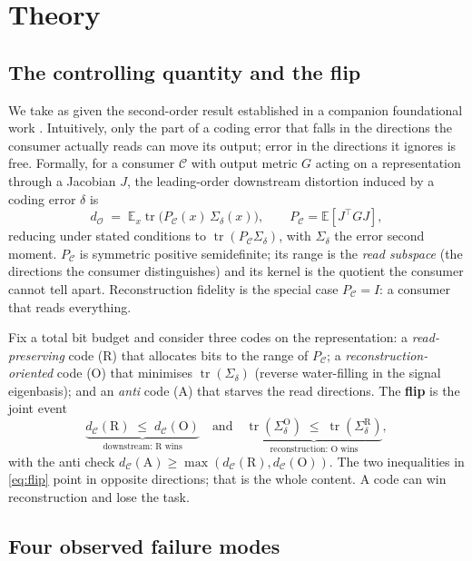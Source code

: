 \documentclass[11pt]{article}
\theoremstyle{remark}
\newcommand{\PC}{P_{\mathcal{C}}}
\newcommand{\Sd}{\Sigma_{\delta}}
\newcommand{\tr}{\operatorname{tr}}
\newcommand{\dO}{d_{\mathcal{O}}}
\newcommand{\E}{\mathbb{E}}
\begin{document}
\section{Theory}\label{sec:theory}

\subsection{The controlling quantity and the flip}

We take as given the second-order result established in a companion foundational work
\citep{cost}. Intuitively, only the part of a coding error that falls in the
directions the consumer actually reads can move its output; error in the directions it
ignores is free. Formally, for a consumer $\mathcal{C}$ with output metric $G$ acting on a
representation through a Jacobian $J$, the leading-order downstream distortion induced by
a coding error $\delta$ is
\begin{equation}\label{eq:do}
\dO \;=\; \E_x \tr\!\big(\PC(x)\,\Sd(x)\big),\qquad \PC=\E[J^\top G J],
\end{equation}
reducing under stated conditions to $\tr(\PC\Sd)$, with $\Sd$ the error second moment.
$\PC$ is symmetric positive semidefinite; its range is the \emph{read subspace} (the
directions the consumer distinguishes) and its kernel is the quotient the consumer cannot
tell apart. Reconstruction fidelity is the special case $\PC=I$: a consumer that reads
everything.

Fix a total bit budget and consider three codes on the representation:
a \emph{read-preserving} code (R) that allocates bits to the range of $\PC$; a
\emph{reconstruction-oriented} code (O) that minimises $\tr(\Sd)$ (reverse water-filling
\citep{cover2006} in the signal eigenbasis); and an \emph{anti} code (A) that starves the
read directions.
The \textbf{flip} is the joint event
\begin{equation}\label{eq:flip}
\underbrace{d_{\mathcal C}(\text{R}) \;\le\; d_{\mathcal C}(\text{O})}_{\text{downstream: R wins}}
\quad\text{and}\quad
\underbrace{\tr(\Sd^{\text{O}}) \;\le\; \tr(\Sd^{\text{R}})}_{\text{reconstruction: O wins}} ,
\end{equation}
with the anti check $d_{\mathcal C}(\text{A}) \ge \max(d_{\mathcal C}(\text{R}),
d_{\mathcal C}(\text{O}))$. The two inequalities in \eqref{eq:flip} point in opposite
directions; that is the whole content. A code can win reconstruction and lose the task.

\subsection{Four observed failure modes}\label{sec:taxonomy}
\end{document}
